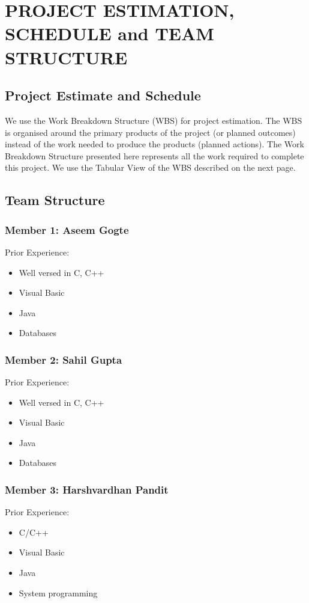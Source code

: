 \chapter{PROJECT ESTIMATION, SCHEDULE and TEAM STRUCTURE}
\section{Project Estimate and Schedule}
We use the Work Breakdown Structure (WBS) for project estimation. The WBS is
organised around the primary products of the project (or planned outcomes) instead of
the work needed to produce the products (planned actions). The Work Breakdown
Structure presented here represents all the work required to complete this project. We
use the Tabular View of the WBS described on the next page.
\section{Team Structure}
\subsection{Member 1: Aseem Gogte}
Prior Experience:
\begin{itemize}
\item Well versed in C, C++
\item Visual Basic
\item Java
\item Databases
\end{itemize}

\subsection{Member 2: Sahil Gupta}
Prior Experience:
\begin{itemize}
\item Well versed in C, C++
\item Visual Basic
\item Java
\item Databases
\end{itemize}

\subsection{Member 3: Harshvardhan Pandit}
Prior Experience:
\begin{itemize}
\item C/C++
\item Visual Basic
\item Java
\item System programming
\end{itemize}

